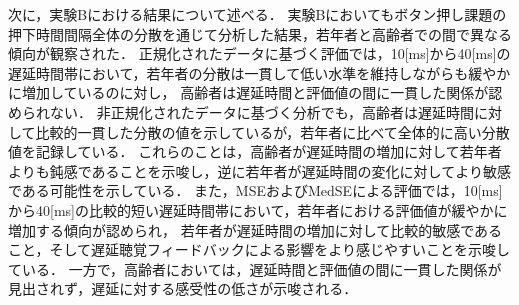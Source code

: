 次に，実験Bにおける結果について述べる．
実験Bにおいてもボタン押し課題の押下時間間隔全体の分散を通じて分析した結果，若年者と高齢者での間で異なる傾向が観察された．
正規化されたデータに基づく評価では，10[ms]から40[ms]の遅延時間帯において，若年者の分散は一貫して低い水準を維持しながらも緩やかに増加しているのに対し，
高齢者は遅延時間と評価値の間に一貫した関係が認められない．
非正規化されたデータに基づく分析でも，高齢者は遅延時間に対して比較的一貫した分散の値を示しているが，若年者に比べて全体的に高い分散値を記録している．
これらのことは，高齢者が遅延時間の増加に対して若年者よりも鈍感であることを示唆し，逆に若年者が遅延時間の変化に対してより敏感である可能性を示している．
また，MSEおよびMedSEによる評価では，10[ms]から40[ms]の比較的短い遅延時間帯において，若年者における評価値が緩やかに増加する傾向が認められ，
若年者が遅延時間の増加に対して比較的敏感であること，そして遅延聴覚フィードバックによる影響をより感じやすいことを示唆している．
一方で，高齢者においては，遅延時間と評価値の間に一貫した関係が見出されず，遅延に対する感受性の低さが示唆される．

